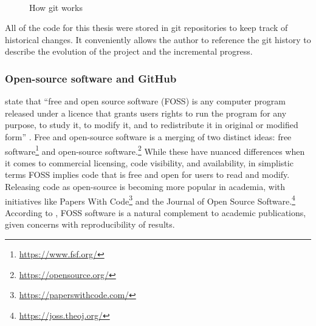 \documentclass[report.tex]{subfiles}
\begin{document}
\begin{figure}[ht]
	\centering
	\\
	\caption{How git works \parencite[6, 8]{gitbook}}
	\label{fig:git}
\end{figure}

All of the code for this thesis were stored in git repositories to keep track of historical changes. It conveniently allows the author to reference the git history to describe the evolution of the project and the incremental progress.

\subsubsection{Open-source software and GitHub}

\citeauthor{floss} state that ``free and open source software (FOSS) is any computer program released under a licence that grants users rights to run the program for any purpose, to study it, to modify it, and to redistribute it in original or modified form'' \parencite[1]{floss}. Free and open-source software is a merging of two distinct ideas: free software\footnote{\url{https://www.fsf.org/}} and open-source software.\footnote{\url{https://opensource.org/}} While these have nuanced differences when it comes to commercial licensing, code visibility, and availability, in simplistic terms FOSS implies code that is free and open for users to read and modify. Releasing code as open-source is becoming more popular in academia, with initiatives like Papers With Code\footnote{\url{https://paperswithcode.com/}} and the Journal of Open Source Software.\footnote{\url{https://joss.theoj.org/}} According to \textcite{floss}, FOSS software is a natural complement to academic publications, given concerns with reproducibility of results.
\end{document}
